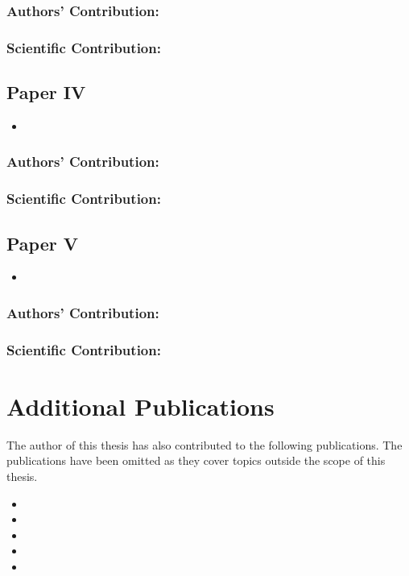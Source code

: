 \subsubsection*{Authors' Contribution:}%
%
\subsubsection*{Scientific Contribution:}%
%
    
\subsection*{Paper IV}%
%
\begin{itemize}
    \item[] 
\end{itemize}

\subsubsection*{Authors' Contribution:}%
%
\subsubsection*{Scientific Contribution:}%
%

\subsection*{Paper V}%
%
\begin{itemize}
    \item[] 
\end{itemize}

\subsubsection*{Authors' Contribution:}%
%
\subsubsection*{Scientific Contribution:}%
%

\section{Additional Publications}%
%
The author of this thesis has also contributed to the following publications.
The publications have been omitted as they cover topics outside the scope of this thesis.

\begin{itemize}
    \item[] 
    \item[] 
    \item[] 
    \item[] 
    \item[] 
\end{itemize}
